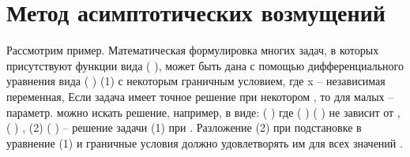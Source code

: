 \chapter*{Метод асимптотических возмущений}

Рассмотрим пример. Математическая формулировка многих задач, в которых
присутствуют функции вида (
), может быть дана с помощью дифференциального
уравнения вида
(
)
(1)
с некоторым граничным условием, где x – независимая переменная,
Если задача имеет точное решение при некотором
, то для малых
– параметр.
можно искать решение, например, в виде:
(
)
где
( )
( )
не зависит от ,
( )
,
(2)
( ) – решение задачи (1) при
. Разложение (2) при
подстановке в уравнение (1) и граничные условия должно удовлетворять им для всех
значений .
